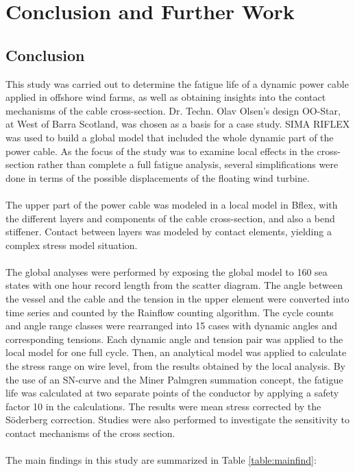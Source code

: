 \chapter{Conclusion and Further Work}
\label{chap:conclusion}
\section{Conclusion}
This study was carried out to determine the fatigue life of a dynamic power cable applied in offshore wind farms, as well as obtaining insights into the contact mechanisms of the cable cross-section. Dr. Techn. Olav Olsen's design OO-Star, at West of Barra Scotland, was chosen as a basis for a case study. SIMA RIFLEX was used to build a global model that included the whole dynamic part of the power cable.  As the focus of the study was to examine local effects in the cross-section rather than complete a full fatigue analysis, several simplifications were done in terms of the possible displacements of the floating wind turbine. \\\\The upper part of the power cable was modeled in a local model in Bflex, with the different layers and components of the cable cross-section, and also a bend stiffener. Contact between layers was modeled by contact elements, yielding a complex stress model situation.\\\\
The global analyses were performed by exposing the global model to 160 sea states with one hour record length from the scatter diagram. The angle between the vessel and the cable and the tension in the upper element were converted into time series and counted by the Rainflow counting algorithm. The cycle counts and angle range classes were rearranged into 15 cases with dynamic angles and corresponding tensions. Each dynamic angle and tension pair was applied to the local model for one full cycle. Then, an analytical model was applied to calculate the stress range on wire level, from the results obtained by the local analysis. By the use of an SN-curve and the Miner Palmgren summation concept, the fatigue life was calculated at two separate points of the conductor by applying a safety factor 10 in the calculations. The results were mean stress corrected by the Söderberg correction. Studies were also performed to investigate the sensitivity to contact mechanisms of the cross section.
\\\\The main findings in this study are summarized in Table \ref{table:mainfind}:

